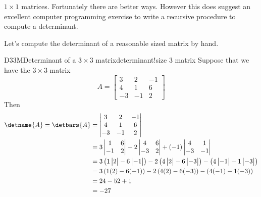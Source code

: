 $1\times 1$ matrices.  Fortunately there are better ways.  However this does suggest an excellent computer programming exercise to write a recursive procedure to compute a determinant.\par
%
Let's compute the determinant of a reasonable sized matrix by hand.
\begin{example}{D33M}{Determinant of a $3\times 3$ matrix}{determinant!size 3 matrix}
Suppose that we have the $3\times 3$ matrix%
\begin{equation*}
A=
\begin{bmatrix}
3 & 2 & -1\\
4 & 1 & 6\\
-3 & -1 & 2
\end{bmatrix}
\end{equation*}
%
Then
%
\begin{align*}
\detname{A}=\detbars{A}
&=\begin{vmatrix}
3 & 2 & -1\\
4 & 1 & 6\\
-3 & -1 & 2
\end{vmatrix}\\
&=
3
\begin{vmatrix}
1 & 6\\
-1 & 2
\end{vmatrix}
-2
\begin{vmatrix}
4 & 6\\
-3 & 2
\end{vmatrix}
+(-1)
\begin{vmatrix}
4 & 1\\
-3 & -1
\end{vmatrix}\\
&=
3\left(
1\begin{vmatrix}
2\\
\end{vmatrix}
-6\begin{vmatrix}
-1
\end{vmatrix}\right)
-2\left(
4\begin{vmatrix}
2
\end{vmatrix}
-6\begin{vmatrix}
-3
\end{vmatrix}\right)
-\left(
4\begin{vmatrix}
-1
\end{vmatrix}
-1\begin{vmatrix}
-3
\end{vmatrix}\right)\\
&=
3\left(1(2)-6(-1)\right)
-2\left(4(2)-6(-3)\right)
-\left(4(-1)-1(-3)\right)\\
&=24-52+1\\
&=-27
\end{align*}
%
\end{example}
